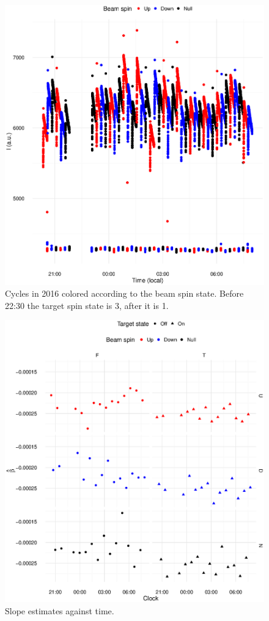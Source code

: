\documentclass{article}
\begin{document}
\begin{figure}
	\centering
	\includegraphics{Cycles2016.eps}
	\caption{Cycles in 2016 colored according to the beam spin state. Before 22:30 the target spin state is 3, after it is 1.\label{fig:Cycles}}
\end{figure}
\begin{figure}
	\centering
	\includegraphics{Slopes2016_VS_Clock.eps}
	\caption{Slope estimates against time.\label{fig:Slopes}}
\end{figure}	
	
\end{document}
